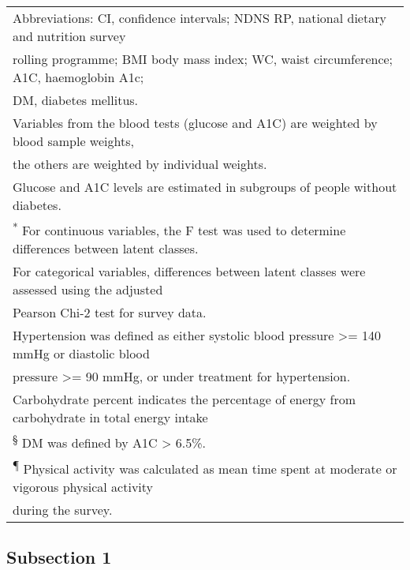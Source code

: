 \begin{table}
\begin{tabular}[t]{lccc}
			\multicolumn{4}{l}{Abbreviations: CI, confidence intervals; NDNS RP, national dietary and nutrition survey}\\ 
			\multicolumn{4}{l}{rolling programme; BMI body mass index; WC, waist circumference; A1C, haemoglobin A1c;}\\ 
			\multicolumn{4}{l}{DM, diabetes mellitus.}\\
			\multicolumn{4}{l}{Variables from the blood tests (glucose and A1C) are weighted by blood sample weights,}\\  
			\multicolumn{4}{l}{the others are weighted by individual weights.}\\
			\multicolumn{4}{l}{Glucose and A1C levels are estimated in subgroups of people without diabetes.}\\
			\multicolumn{4}{l}{\textsuperscript{*} For continuous variables, the F test was used to determine differences between latent classes.}\\
			\multicolumn{4}{l}{For categorical variables, differences between latent classes were assessed using the adjusted}\\
			\multicolumn{4}{l}{Pearson Chi-2 test for survey data.}\\
			\multicolumn{4}{l}{\textsuperscript{\dag} Hypertension was defined as either systolic blood pressure >= 140 mmHg or diastolic blood}\\
			\multicolumn{4}{l}{pressure >= 90 mmHg, or under treatment for hypertension.}\\
			\multicolumn{4}{l}{\textsuperscript{\ddag} Carbohydrate percent indicates the percentage of energy from carbohydrate in total energy intake}\\
			\multicolumn{4}{l}{\textsuperscript{\S} DM was defined by A1C > 6.5\%.}\\
			\multicolumn{4}{l}{\textsuperscript{\P} Physical activity was calculated as mean time spent at moderate or vigorous physical activity}\\
			\multicolumn{4}{l}{during the survey.}\\
		\end{tabular}
	\end{table}

\subsection{Subsection 1}


